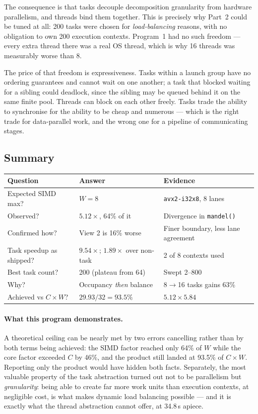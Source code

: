 \documentclass[11pt,a4paper]{article}
\begin{document}
The consequence is that tasks decouple decomposition granularity from hardware
parallelism, and threads bind them together. This is precisely why Part~2 could
be tuned at all: 200 tasks were chosen for \emph{load-balancing} reasons, with
no obligation to own 200 execution contexts. Program~1 had no such freedom ---
every extra thread there was a real OS thread, which is why 16 threads was
measurably worse than 8.

The price of that freedom is expressiveness. Tasks within a launch group have
no ordering guarantees and cannot wait on one another; a task that blocked
waiting for a sibling could deadlock, since the sibling may be queued behind it
on the same finite pool. Threads can block on each other freely. Tasks trade
the ability to synchronise for the ability to be cheap and numerous --- which is
the right trade for data-parallel work, and the wrong one for a pipeline of
communicating stages.

\subsection{Summary}

\begin{table}[H]
\centering
\begin{tabular}{lll}
\toprule
Question & Answer & Evidence \\
\midrule
Expected SIMD max?      & $W = 8$                    & \texttt{avx2-i32x8}, 8 lanes \\
Observed?               & $5.12\times$, 64\% of it   & Divergence in \texttt{mandel()} \\
Confirmed how?          & View 2 is 16\% worse       & Finer boundary, less lane agreement \\
Task speedup as shipped?& $9.54\times$; $1.89\times$ over non-task & 2 of 8 contexts used \\
Best task count?        & 200 (plateau from 64)      & Swept 2--800 \\
Why?                    & Occupancy \emph{then} balance & 8$\to$16 tasks gains 63\% \\
Achieved vs $C \times W$? & $29.93 / 32 = 93.5\%$    & $5.12 \times 5.84$ \\
\bottomrule
\end{tabular}
\end{table}

\paragraph{What this program demonstrates.} A theoretical ceiling can be nearly
met by two errors cancelling rather than by both terms being achieved: the SIMD
factor reached only 64\% of $W$ while the core factor exceeded $C$ by 46\%, and
the product still landed at 93.5\% of $C \times W$. Reporting only the product
would have hidden both facts. Separately, the most valuable property of the
task abstraction turned out not to be parallelism but \emph{granularity}: being
able to create far more work units than execution contexts, at negligible cost,
is what makes dynamic load balancing possible --- and it is exactly what the
thread abstraction cannot offer, at 34.8\,\textmu s apiece.
\end{document}

